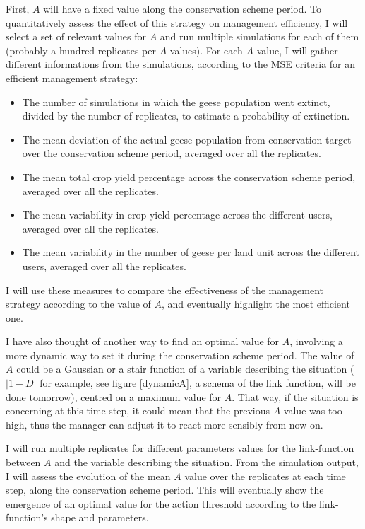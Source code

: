 \documentclass[12pt,a4paper]{article}
\begin{document}
First, $A$ will have a fixed value along the conservation scheme period.
To quantitatively assess the effect of this strategy on management efficiency, I will select a set of relevant values for $A$ and run multiple simulations for each of them (probably a hundred replicates per $A$ values).
For each $A$ value, I will gather different informations from the simulations, according to the MSE criteria for an efficient management strategy:
\begin{itemize}
	\item The number of simulations in which the geese population went extinct, divided by the number of replicates, to estimate a probability of extinction.
	\item The mean deviation of the actual geese population from conservation target over the conservation scheme period, averaged over all the replicates.
	\item The mean total crop yield percentage across the conservation scheme period, averaged over all the replicates.
	\item The mean variability in crop yield percentage across the different users, averaged over all the replicates.
	\item The mean variability in the number of geese per land unit across the different users, averaged over all the replicates.
\end{itemize}
I will use these measures to compare the effectiveness of the management strategy according to the value of $A$, and eventually highlight the most efficient one.

I have also thought of another way to find an optimal value for $A$, involving a more dynamic way to set it during the conservation scheme period.
The value of $A$ could be a Gaussian or a stair function of a variable describing the situation ($|1-D|$ for example, see figure \ref{dynamicA}, a schema of the link function, will be done tomorrow), centred on a maximum value for $A$.
That way, if the situation is concerning at this time step, it could mean that the previous $A$ value was too high, thus the manager can adjust it to react more sensibly from now on.

I will run multiple replicates for different parameters values for the link-function between $A$ and the variable describing the situation.
From the simulation output, I will assess the evolution of the mean $A$ value over the replicates at each time step, along the conservation scheme period.
This will eventually show the emergence of an optimal value for the action threshold according to the link-function's shape and parameters.
\end{document}

